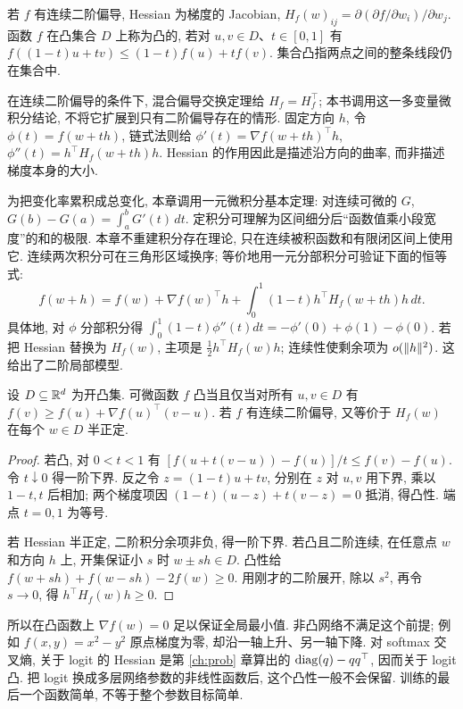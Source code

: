 \begin{definition}
若 $f$ 有连续二阶偏导, Hessian 为梯度的 Jacobian,
$H_f(w)_{ij}=\partial(\partial f/\partial w_i)/\partial w_j$.
函数 $f$ 在凸集合 $D$ 上称为凸的, 若对 $u,v\in D$、$t\in[0,1]$ 有
$f((1-t)u+tv)\le(1-t)f(u)+tf(v)$.
集合凸指两点之间的整条线段仍在集合中.
\end{definition}
在连续二阶偏导的条件下, 混合偏导交换定理给 $H_f=H_f^\top$; 本书调用这一多变量微积分结论, 不将它扩展到只有二阶偏导存在的情形\cite{dl}. 固定方向 $h$, 令 $\phi(t)=f(w+th)$, 链式法则给 $\phi'(t)=\nabla f(w+th)^\top h$, $\phi''(t)=h^\top H_f(w+th)h$. Hessian 的作用因此是描述沿方向的曲率, 而非描述梯度本身的大小.

为把变化率累积成总变化, 本章调用一元微积分基本定理: 对连续可微的 $G$, $G(b)-G(a)=\int_a^bG'(t)\,dt$. 定积分可理解为区间细分后“函数值乘小段宽度”的和的极限. 本章不重建积分存在理论, 只在连续被积函数和有限闭区间上使用它. 连续两次积分可在三角形区域换序; 等价地用一元分部积分可验证下面的恒等式:
\[
f(w+h)=f(w)+\nabla f(w)^\top h
+\int_0^1(1-t)h^\top H_f(w+th)h\,dt.
\]
具体地, 对 $\phi$ 分部积分得
$\int_0^1(1-t)\phi''(t)dt=-\phi'(0)+\phi(1)-\phi(0)$.
若把 Hessian 替换为 $H_f(w)$, 主项是 $\tfrac12h^\top H_f(w)h$; 连续性使剩余项为 $o(\lVert h\rVert^2)$. 这给出了二阶局部模型.

\begin{proposition}\label{prop:convex}
设 $D\subseteq\mathbb R^d$ 为开凸集. 可微函数 $f$ 凸当且仅当对所有 $u,v\in D$ 有
$f(v)\ge f(u)+\nabla f(u)^\top(v-u)$.
若 $f$ 有连续二阶偏导, 又等价于 $H_f(w)$ 在每个 $w\in D$ 半正定.
\end{proposition}
\begin{proof}
若凸, 对 $0<t<1$ 有
$[f(u+t(v-u))-f(u)]/t\le f(v)-f(u)$.
令 $t\downarrow0$ 得一阶下界. 反之令 $z=(1-t)u+tv$, 分别在 $z$ 对 $u,v$ 用下界, 乘以 $1-t,t$ 后相加; 两个梯度项因 $(1-t)(u-z)+t(v-z)=0$ 抵消, 得凸性. 端点 $t=0,1$ 为等号.

若 Hessian 半正定, 二阶积分余项非负, 得一阶下界. 若凸且二阶连续, 在任意点 $w$ 和方向 $h$ 上, 开集保证小 $s$ 时 $w\pm sh\in D$. 凸性给 $f(w+sh)+f(w-sh)-2f(w)\ge0$. 用刚才的二阶展开, 除以 $s^2$, 再令 $s\to0$, 得 $h^\top H_f(w)h\ge0$.
\end{proof}
所以在凸函数上 $\nabla f(w)=0$ 足以保证全局最小值. 非凸网络不满足这个前提; 例如 $f(x,y)=x^2-y^2$ 原点梯度为零, 却沿一轴上升、另一轴下降. 对 softmax 交叉熵, 关于 logit 的 Hessian 是第 \ref{ch:prob} 章算出的 $\operatorname{diag}(q)-qq^\top$, 因而关于 logit 凸. 把 logit 换成多层网络参数的非线性函数后, 这个凸性一般不会保留. 训练的最后一个函数简单, 不等于整个参数目标简单.

